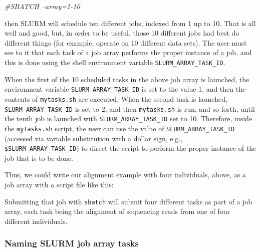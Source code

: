 \documentclass[]{krantz}
\makeatletter
\newenvironment{Shaded}{\begin{snugshade}}{\end{snugshade}}
\newcommand{\CommentTok}[1]{\textcolor[rgb]{0.37,0.37,0.37}{\textit{#1}}}
\newcommand{\ExtensionTok}[1]{#1}
\newcommand{\NormalTok}[1]{#1}
\newcommand{\VariableTok}[1]{\textcolor[rgb]{0,0,0}{#1}}
\newenvironment{kframe}{%
\medskip{}
\setlength{\fboxsep}{.8em}
 \def\at@end@of@kframe{}%
 \ifinner\ifhmode%
  \def\at@end@of@kframe{\end{minipage}}%
  \begin{minipage}{\columnwidth}%
 \fi\fi%
 \def\FrameCommand##1{\hskip\@totalleftmargin \hskip-\fboxsep
 \colorbox{shadecolor}{##1}\hskip-\fboxsep
     \hskip-\linewidth \hskip-\@totalleftmargin \hskip\columnwidth}%
 \MakeFramed {\advance\hsize-\width
   \@totalleftmargin\z@ \linewidth\hsize
   \@setminipage}}%
 {\par\unskip\endMakeFramed%
 \at@end@of@kframe}
\renewenvironment{Shaded}{\begin{kframe}}{\end{kframe}}
\makeatother
\begin{document}
\begin{Shaded}
\begin{Highlighting}[]
\CommentTok{#SBATCH --array=1-10}
\end{Highlighting}
\end{Shaded}

then SLURM will schedule ten different jobs, indexed from 1 up to 10. That is all
well and good, but, in order to be useful, those 10 different jobs had best do
different things (for example, operate on 10 different data sets). The user must
see to it that each task of a job array performs the proper instance of a
job, and this is done using the shell environment variable \texttt{SLURM\_ARRAY\_TASK\_ID}.

When the first of the 10 scheduled tasks in the above job array is launched,
the environment variable \texttt{SLURM\_ARRAY\_TASK\_ID} is set to the value 1, and then
the contents of \texttt{mytasks.sh} are executed. When the second task is launched,
\texttt{SLURM\_ARRAY\_TASK\_ID} is set to 2, and then \texttt{mytasks.sh} is run, and so forth,
until the tenth job is launched with \texttt{SLURM\_ARRAY\_TASK\_ID} set to 10. Therefore, inside
the \texttt{mytasks.sh} script, the user can use the value of \texttt{SLURM\_ARRAY\_TASK\_ID} (accessed
via variable substitution with a dollar sign, e.g., \texttt{\$SLURM\_ARRAY\_TASK\_ID}) to
direct the script to perform the proper instance of the job that is to be done.

Thus, we could write our alignment example with four individuals, above,
as a job array with a script file like this:

\begin{Shaded}
\end{Shaded}

Submitting that job with \texttt{sbatch} will submit four different tasks as part of
a job array, each task being the alignment of sequencing reads from one of
four different individuals.

\hypertarget{naming-slurm-job-array-tasks}{%
\subsubsection{Naming SLURM job array tasks}\label{naming-slurm-job-array-tasks}}
\end{document}
